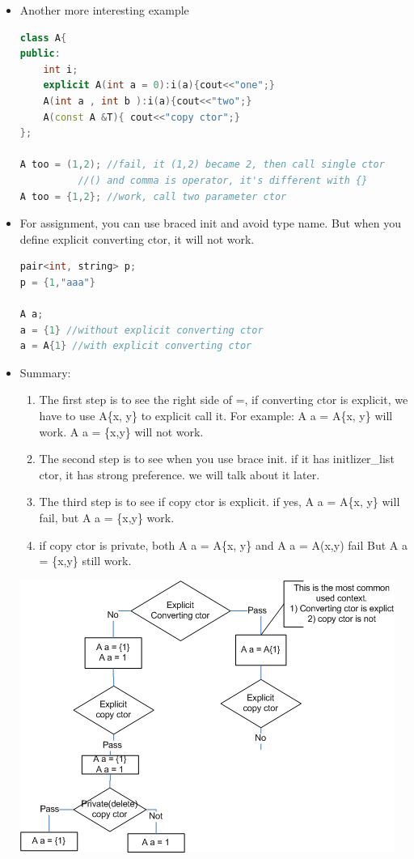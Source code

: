 \documentclass[a4paper,12pt,twoside]{book}
\begin{document}
\begin{itemize}
\item Another more interesting example 

\begin{lstlisting}[frame=single, language=c++]
class A{
public:
	int i;
	explicit A(int a = 0):i(a){cout<<"one";}
	A(int a , int b ):i(a){cout<<"two";}
	A(const A &T){ cout<<"copy ctor";} 
};

A too = (1,2); //fail, it (1,2) became 2, then call single ctor
          //() and comma is operator, it's different with {}
A too = {1,2}; //work, call two parameter ctor
\end{lstlisting}


	\item For assignment, you can use braced init and avoid type name. But when you define explicit converting ctor, it will not work. 
\begin{lstlisting}[frame=single, language=c++]
pair<int, string> p;
p = {1,"aaa"}

A a;
a = {1} //without explicit converting ctor
a = A{1} //with explicit converting ctor
\end{lstlisting}


\item Summary:
\begin{enumerate}
	\item The first step is to see the right side of =, if converting ctor is explicit, we have to use A\{x, y\} to explicit call it. For example: A a = A\{x, y\} will work. A a = \{x,y\} will not work. 
	
	\item The second step is to see when you use brace init. if it has initlizer\_list ctor, it has strong preference. we will talk about it later.
	
	\item The third step is to see if copy ctor is explicit. if yes, A a = A\{x, y\} will fail, but A a = \{x,y\} work.
	
	\item if copy ctor is private, both A a = A\{x, y\} and A a = A(x,y) fail But A a = \{x,y\} still work.
	
\end{enumerate}

	\includegraphics[scale=0.8]{pics/copy_init.png} \\


\end{itemize}
\end{document}
